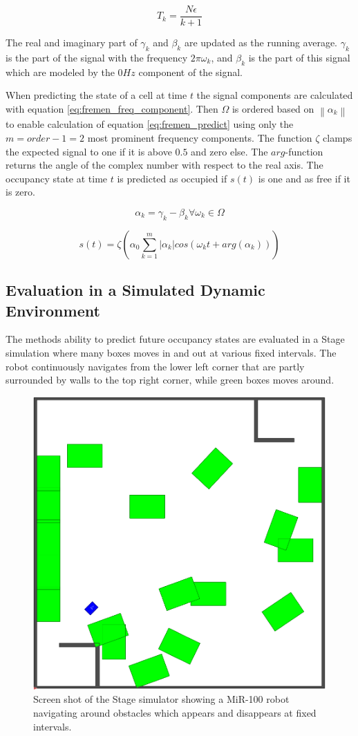 \begin{equation}
T_k = \frac{N \epsilon}{k+1}
\label{eq:fremen_time}
\end{equation}

The real and imaginary part of $\gamma_k$ and $\beta_k$ are updated as the running average. $\gamma_k$ is the part of the signal with the frequency $2 \pi \omega_k$, and $\beta_k$ is the part of this signal which are modeled by the $0Hz$ component of the signal.

When predicting the state of a cell at time $t$ the signal components are calculated with equation \ref{eq:fremen_freq_component}.
Then $ \Omega $ is ordered based on $ \left\| \alpha_k \right\| $ to enable calculation of equation \ref{eq:fremen_predict} using only the $m=order-1=2$ most prominent frequency components.
The function $\zeta$ clamps the expected signal to one if it is above $0.5$ and zero else. The $arg$-function returns the angle of the complex number with respect to the real axis.
The occupancy state at time $t$ is predicted as occupied if $s(t)$ is one and as free if it is zero.

\begin{equation}
\alpha_k = \gamma_k - \beta_k \forall \omega_k \in \Omega
\label{eq:fremen_freq_component}
\end{equation}

\begin{equation}
s(t) = \zeta \left( \alpha_0 \sum_{k=1}^{m} |\alpha_k| cos(\omega_k t + arg(\alpha_k))  \right)
\label{eq:fremen_predict}
\end{equation}

\subsection{Evaluation in a Simulated Dynamic Environment}
The methods ability to predict future occupancy states are evaluated in a Stage simulation \cite{Vaughan2008} where many boxes moves in and out at various fixed intervals. 
The robot continuously navigates from the lower left corner that are partly surrounded by walls to the top right corner, while green boxes moves around.

\begin{figure}[htbp]
    \centering
    \includegraphics[width=0.4\linewidth]{chapters/mapping_of_dynamic_areas/figures/simulated_environment}
    \caption{Screen shot of the Stage simulator showing a MiR-100 robot navigating around obstacles which appears and disappears at fixed intervals.}
    \label{fig:simulated_environment}
\end{figure}

